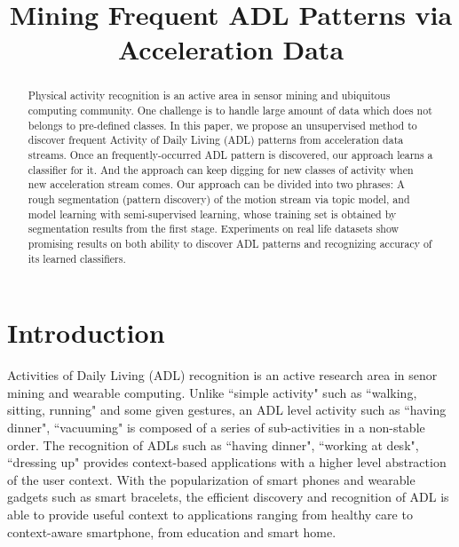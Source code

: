 \documentclass{sigchi}
\begin{document}
\title{Mining Frequent ADL Patterns via Acceleration Data}



\maketitle

\begin{abstract}
Physical activity recognition is an active area in sensor mining and ubiquitous computing community. 
One challenge is to handle large amount of data which does not belongs to pre-defined classes.
In this paper, we propose an unsupervised method to discover frequent Activity of Daily Living (ADL) patterns from acceleration data streams.
Once an frequently-occurred ADL pattern is discovered, our approach learns a classifier for it.
And the approach can keep digging for new classes of activity when new acceleration stream comes.
Our approach can be divided into two phrases:
 A rough segmentation (pattern discovery) of the motion stream via topic model, and model learning with semi-supervised learning, whose training set is obtained by segmentation results from the first stage.
 Experiments on real life datasets show promising results on both ability to discover ADL patterns and recognizing accuracy of its learned classifiers.
\end{abstract}


\section{Introduction}

Activities of Daily Living (ADL) recognition is an active research area in senor mining and wearable computing.
Unlike ``simple activity" such as ``walking, sitting, running" and some given gestures, an ADL level activity such as ``having dinner", ``vacuuming" is composed of a series of sub-activities in a non-stable order.
The recognition of ADLs such as ``having dinner", ``working at desk", ``dressing up" provides context-based applications with a higher level abstraction of the user context.
With the popularization of smart phones and wearable gadgets such as smart bracelets, the efficient discovery and recognition of ADL is able to provide useful context to applications ranging from healthy care to context-aware smartphone, from education and smart home.
\end{document}
